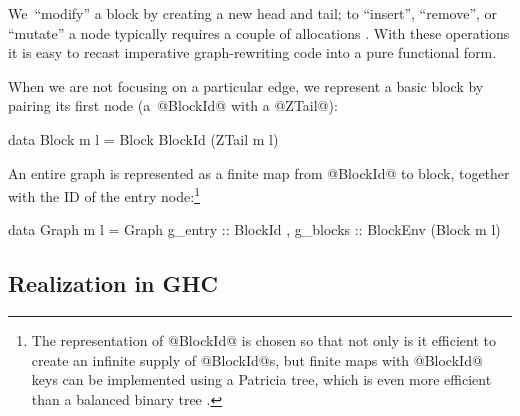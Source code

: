 \documentclass[blockstyle,preprint,nocopyrightspace]{sigplanconf}
\let\cite\citep
\begin{document}
We~``modify'' a block by creating a new head and tail; to ``insert'',
``remove'', or ``mutate'' a node typically requires a couple of
allocations 
\cite{dias-ramsey:applicative-flow-graph}. 
With these operations it is easy to recast imperative graph-rewriting
code into a pure functional form.


When we are not focusing on a particular edge, we represent a basic
block by pairing its first node (a~@BlockId@ with a @ZTail@):
\begin{code}
data Block m l = Block BlockId (ZTail m l)
\end{code}
An entire graph is represented as a finite map from @BlockId@ to
block, together with the ID of the entry node:\footnote
{The representation of @BlockId@ is chosen so that not only is
  it efficient to create an infinite supply of @BlockId@s, but finite
  maps with @BlockId@ keys can be implemented using a Patricia tree,
  which is even more efficient than a balanced binary tree
  \cite{okasaki-gill:integer-map}.} 
\begin{code}
data Graph m l =
   Graph { g_entry  :: BlockId
         , g_blocks :: BlockEnv (Block m l) }
\end{code}


\subsection{Realization in GHC}
\end{document}
